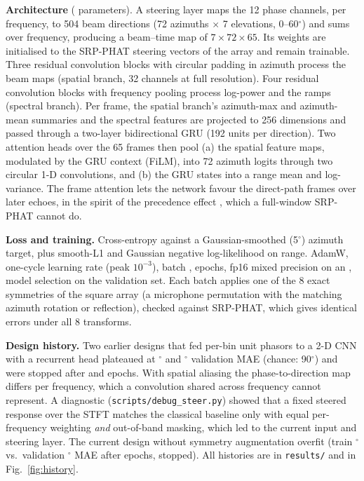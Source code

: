 \textbf{Architecture} (\TrainFullParams{} parameters). A steering layer maps the 12 phase
channels, per frequency, to 504 beam directions (72 azimuths $\times$ 7 elevations,
0--60$^\circ$) and sums over frequency, producing a beam--time map of $7\times72\times65$. Its
weights are initialised to the SRP-PHAT steering vectors of the array and remain trainable.
Three residual convolution blocks with circular padding in azimuth process the beam maps
(spatial branch, 32 channels at full resolution). Four residual convolution blocks with
frequency pooling process log-power and the ramps (spectral branch). Per frame, the spatial
branch's azimuth-max and azimuth-mean summaries and the spectral features are projected to 256
dimensions and passed through a two-layer bidirectional GRU (192 units per direction). Two
attention heads over the 65 frames then pool (a) the spatial feature maps, modulated by the GRU
context (FiLM), into 72 azimuth logits through two circular 1-D convolutions, and (b) the GRU
states into a range mean and log-variance. The frame attention lets the network favour the
direct-path frames over later echoes, in the spirit of the precedence effect
\cite{litovsky1999precedence}, which a full-window SRP-PHAT cannot do.

\textbf{Loss and training.} Cross-entropy against a Gaussian-smoothed (5$^\circ$) azimuth target,
plus smooth-L1 and Gaussian negative log-likelihood on range. AdamW, one-cycle learning rate
(peak $10^{-3}$), batch \BatchSize, \TrainFullEpochs{} epochs, fp16 mixed precision on an
\GPU{}, model selection on the validation set. Each batch applies one of the 8 exact symmetries
of the square array (a microphone permutation with the matching azimuth rotation or
reflection), checked against SRP-PHAT, which gives identical errors under all 8 transforms.

\textbf{Design history.} Two earlier designs that fed per-bin unit phasors to a 2-D CNN with a
recurrent head plateaued at \AbortOneValMAE$^\circ$ and \AbortTwoValMAE$^\circ$ validation MAE
(chance: 90$^\circ$) and were stopped after \AbortOneEpochs{} and \AbortTwoEpochs{} epochs. With
spatial aliasing the phase-to-direction map differs per frequency, which a convolution shared
across frequency cannot represent. A diagnostic (\texttt{scripts/debug\_steer.py}) showed that a
fixed steered response over the STFT matches the classical baseline only with equal per-frequency
weighting \emph{and} out-of-band masking, which led to the current input and steering layer. The
current design without symmetry augmentation overfit (train \NoAugTrainMAE$^\circ$ vs.\
validation \NoAugValMAE$^\circ$ MAE after \NoAugEpochs{} epochs, stopped). All histories are in
\texttt{results/} and in Fig.~\ref{fig:history}.


